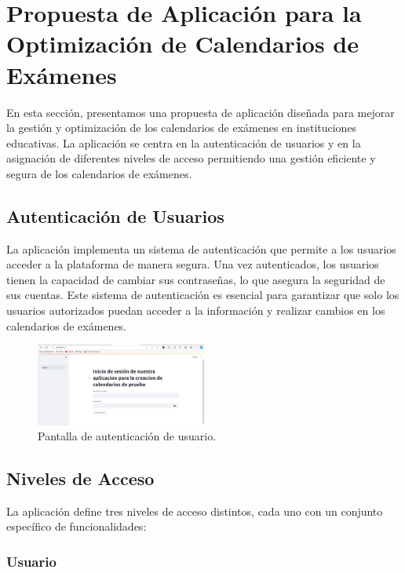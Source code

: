 \documentclass{article}
\begin{document}
\section{Propuesta de Aplicación para la Optimización de Calendarios de Exámenes}

En esta sección, presentamos una propuesta de aplicación diseñada para mejorar la gestión y optimización de los calendarios de exámenes en instituciones educativas. La aplicación se centra en la autenticación de usuarios y en la asignación de diferentes niveles de acceso permitiendo una gestión eficiente y segura de los calendarios de exámenes.

\subsection{Autenticación de Usuarios}

La aplicación implementa un sistema de autenticación  que permite a los usuarios acceder a la plataforma de manera segura. Una vez autenticados, los usuarios tienen la capacidad de cambiar sus contraseñas, lo que asegura la seguridad de sus cuentas. Este sistema de autenticación es esencial para garantizar que solo los usuarios autorizados puedan acceder a la información y realizar cambios en los calendarios de exámenes.

\begin{figure}[h!] \centering \includegraphics[width=0.5\textwidth]{autenticacion_usuario.png} \caption{Pantalla de autenticación de usuario.} \end{figure}

\subsection{Niveles de Acceso}

La aplicación define tres niveles de acceso distintos, cada uno con un conjunto específico de funcionalidades:

\subsubsection{Usuario}
\end{document}
